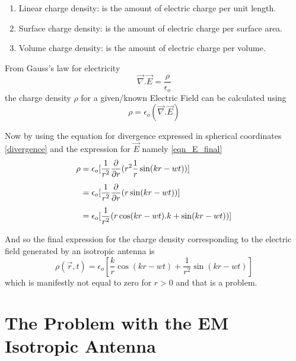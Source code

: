 \begin{enumerate}
   \item Linear charge density: is the amount of electric charge per unit length.
   \item Surface charge density: is the amount of electric charge per surface area.
   \item Volume charge density: is the amount of electric charge per volume.
\end{enumerate}

From Gauss's law for electricity
\begin{equation}
\vec{\nabla}.\vec{E} = \frac{\rho}{\epsilon_{o}}
\end{equation}
the charge density $\rho$ for a given/known Electric Field can be calculated using
\begin{equation}
\rho = {\epsilon_{o}}(\vec{\nabla}.\vec{E})
\end{equation}

Now by using the equation for divergence expressed in spherical coordinates \eqref{divergence} and the expression for $\vec{E}$ namely \eqref{eqn_E_final}
\begin{equation}
   \begin{aligned}
      \rho &= {\epsilon_{o}}[\frac{1}{r^2}\frac{\partial}{\partial r}(r^2\frac{1}{r}\sin(kr-wt))]\\[0.3\baselineskip]
           &= {\epsilon_{o}}[\frac{1}{r^2}\frac{\partial}{\partial r}(r\sin(kr-wt))]\\[0.3\baselineskip]
           &= {\epsilon_{o}}[\frac{1}{r^2}(r\cos(kr-wt).k+\sin(kr-wt))]
   \end{aligned}
\end{equation}

And so the final expression for the charge density corresponding to the electric field generated by an isotropic antenna is
\begin{equation}\label{eqn:rho_final}
   \rho(\vec{r}, t) = {\epsilon_{o}}[\frac{k}{r}\cos(kr-wt)+\frac{1}{r^2}\sin(kr-wt)]
\end{equation}
%
which is manifestly not equal to zero for $r > 0$ and that is a problem.


\section{The Problem with the EM Isotropic Antenna}

